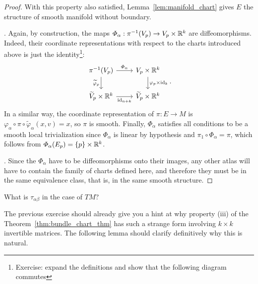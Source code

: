 \begin{proof}
With this property also satisfied, Lemma~\ref{lem:manifold_chart} gives $E$ the structure of smooth manifold without boundary.

.
Again, by construction, the maps $\varPhi_\alpha : \pi^{-1}(V_p) \to V_p\times\mathbb{R}^k$ are diffeomorphisms.
Indeed, their coordinate representations with respect to the charts introduced above is just the identity\footnote{Exercise: expand the definitions and show that the following diagram commutes}:
\begin{equation}
  \begin{tikzcd}
    {\pi^{-1}(V_p)} & {V_p\times\R^k} \\
    {\widetilde{V}_p\times\R^k} & {\widetilde{V}_p\times\R^k}
    \arrow["{\varPhi_\alpha}", from=1-1, to=1-2]
    \arrow["{\varphi_p\times\id_k}", from=1-2, to=2-2]
    \arrow["{\widetilde{\varphi}_p}"', from=1-1, to=2-1]
    \arrow["{\id_{n+k}}"', from=2-1, to=2-2]
  \end{tikzcd}.
\end{equation}
In a similar way, the coordinate representation of $\pi : E \to M$ is $\varphi_\alpha \circ \pi \circ \widetilde{\varphi}_\alpha (x,v) = x$, so $\pi$ is smooth.
Finally, $\Phi_\alpha$ satisfies all conditions to be a smooth local trivialization since $\varPhi_\alpha$ is linear by hypothesis and $\pi_1 \circ \varPhi_\alpha = \pi$, which follows from $\varPhi_\alpha(E_p) = \{p\}\times \mathbb{R}^k$.

.
Since the $\varPhi_\alpha$ have to be diffeomorphisms onto their images, any other atlas will have to contain the family of charts defined here, and therefore they must be in the same equivalence class, that is, in the same smooth structure.
\end{proof}

\begin{exercise}
  What is $\tau_{\alpha\beta}$ in the case of $TM$?
\end{exercise}

The previous exercise should already give you a hint at why property (iii) of the Theorem~\ref{thm:bundle_chart_thm} has such a strange form involving $k\times k$ invertible matrices.
The following lemma should clarify definitively why this is natural.

